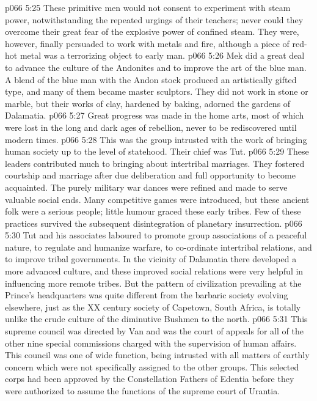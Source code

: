 \vs p066 5:25 These primitive men would not consent to experiment with steam power, notwithstanding the repeated urgings of their teachers; never could they overcome their great fear of the explosive power of confined steam. They were, however, finally persuaded to work with metals and fire, although a piece of red\hyp{}hot metal was a terrorizing object to early man.
\vs p066 5:26 Mek did a great deal to advance the culture of the Andonites and to improve the art of the blue man. A blend of the blue man with the Andon stock produced an artistically gifted type, and many of them became master sculptors. They did not work in stone or marble, but their works of clay, hardened by baking, adorned the gardens of Dalamatia.
\vs p066 5:27 Great progress was made in the home arts, most of which were lost in the long and dark ages of rebellion, never to be rediscovered until modern times.
\vs p066 5:28 \bibnobreakspace {} This was the group intrusted with the work of bringing human society up to the level of statehood. Their chief was Tut.
\vs p066 5:29 These leaders contributed much to bringing about intertribal marriages. They fostered courtship and marriage after due deliberation and full opportunity to become acquainted. The purely military war dances were refined and made to serve valuable social ends. Many competitive games were introduced, but these ancient folk were a serious people; little humour graced these early tribes. Few of these practices survived the subsequent disintegration of planetary insurrection.
\vs p066 5:30 Tut and his associates laboured to promote group associations of a peaceful nature, to regulate and humanize warfare, to co\hyp{}ordinate intertribal relations, and to improve tribal governments. In the vicinity of Dalamatia there developed a more advanced culture, and these improved social relations were very helpful in influencing more remote tribes. But the pattern of civilization prevailing at the Prince’s headquarters was quite different from the barbaric society evolving elsewhere, just as the XX century society of Capetown, South Africa, is totally unlike the crude culture of the diminutive Bushmen to the north.
\vs p066 5:31 \bibnobreakspace {} This supreme council was directed by Van and was the court of appeals for all of the other nine special commissions charged with the supervision of human affairs. This council was one of wide function, being intrusted with all matters of earthly concern which were not specifically assigned to the other groups. This selected corps had been approved by the Constellation Fathers of Edentia before they were authorized to assume the functions of the supreme court of Urantia.
